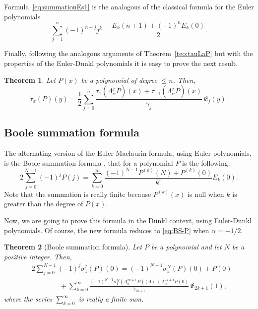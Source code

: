 \documentclass[10pt]{article}
\theoremstyle{plain}
\newtheorem{theorem}{Theorem}[section]
\theoremstyle{definition}
\numberwithin{equation}{section} %
\newcommand{\La}{\Lambda_{\alpha}}
\newcommand{\E}{\mathfrak{E}}
\newcommand{\cc}{\gamma}
\begin{document}
Formula~\eqref{eq:summationEs1} is the analogous of the classical formula for the Euler polynomials
\[
  \sum_{j=1}^n (-1)^{n-j} j^k = \frac{E_k(n+1)+(-1)^nE_k(0)}{2}.
\]

Finally, following the analogous arguments of Theorem~\ref{teo:tauLaP} but with the properties of the Euler-Dunkl polynomials it is easy to prove the next result.

\begin{theorem}
Let $P(x)$ be a polynomial of degree $\le n$. Then,
\begin{equation}
\label{eq:tauPE}
  \tau_x (P)(y) = \frac{1}{2} \sum_{j=0}^{n} \frac{\tau_1(\La^j P)(x) 
  + \tau_{-1} (\La^j P)(x)}{\cc_j} \, \E_j(y).
\end{equation}
\end{theorem}

\subsection{Boole summation formula}

The alternating version of the Euler-Maclaurin formula, using Euler polynomials, is the Boole summation formula \cite[24.17.1]{Dil-NIST}, that for a polynomial $P$ is the following:
\begin{equation}
\label{eq:BS-P}
  2\sum_{j=0}^{N-1} (-1)^jP(j)=  \sum_{k=0}^{\infty}\frac{(-1)^{N-1}P^{(k)}(N)+P^{(k)}(0)}{k!}E_k(0).
\end{equation}
Note that the summation is really finite because $P^{(k)}(x)$ is null when $k$ is greater than the degree of $P(x)$. 

Now, we are going to prove this formula in the Dunkl context, using Euler-Dunkl polynomials. Of course, the new formula reduces to \eqref{eq:BS-P} when $\alpha=-1/2$.

\begin{theorem}[Boole summation formula]
Let $P$ be a polynomial and let $N$ be a positive integer. Then,
\begin{equation}
\label{eq:BS}
\begin{aligned}
  & 2 \sum_{j=0}^{N-1}(-1)^{j}\sigma_1^j(P)(0) = (-1)^{N-1}\sigma_1^N(P)(0) + P(0) \\ 
  &\qquad\qquad + \sum_{k=0}^{\infty} 
  \frac{(-1)^{N-1}\sigma_1^N(\La^{2k+1} P)(0)+\La^{2k+1} P(0)}{\cc_{2k+1}} \, \E_{2k+1}(1),
\end{aligned} 
\end{equation}
where the series $\sum_{k=0}^{\infty}$ is really a finite sum.
\end{theorem}
\end{document}
